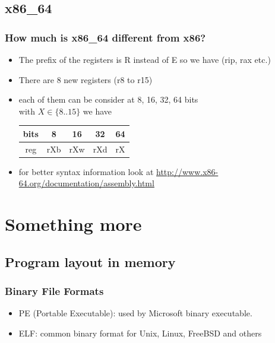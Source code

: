 \documentclass[]{beamer}
\newenvironment{changemargin}[2]{%
  \begin{list}{}{%
    \setlength{\topsep}{0pt}%
    \setlength{\leftmargin}{#1}%
    \setlength{\rightmargin}{#2}%
    \setlength{\listparindent}{\parindent}%
    \setlength{\itemindent}{\parindent}%
    \setlength{\parsep}{\parskip}%
  }%
  \item[]}{\end{list}}
\begin{document}
	\subsection{x86\_64}
		\begin{frame}
			\frametitle{How much is x86\_64 different from x86?}
			\begin{changemargin}{-0.7cm}{0cm}
			\begin{itemize}
				\item{The prefix of  the registers is R instead of E so we have (rip, rax etc.)}
				\item{There are 8 new registers (r8 to r15)}
				\item{each of them can be consider at 8, 16, 32, 64 bits\\
				   with $X \in \{8..15\}$ we have }
				\begin{table}[h]
					\begin{tabular}{|c!{\vrule width 1pt }c|c|c|c|}
					\hline
					bits&8&16&32&64\\
					\hline
					reg&rXb&rXw&rXd&rX\\
					\hline	
					\end{tabular}
				\end{table}
				\item{for better syntax information look at \url{http://www.x86-64.org/documentation/assembly.html}}
			\end{itemize}
			\end{changemargin}
		\end{frame}
\section{Something more}
	\subsection{Program layout in memory}
		\begin{frame}
			\frametitle{Binary File Formats}
				\begin{itemize}
					\item{\color{red}PE (Portable Executable)\color{black}: used by Microsoft binary executable.}
					\item{\color{red}ELF\color{black}: common binary format for Unix, Linux, FreeBSD and others}
				\end{itemize}
		\end{frame}
	
\end{document}
